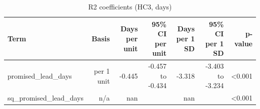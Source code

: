 \begin{table}[htbp]
\centering
\small
\caption{R2 coefficients (HC3, days)}
\begin{tabular}{lrrrrrr}
\toprule
Term & Basis & Days per unit & 95\% CI per unit & Days per 1 SD & 95\% CI per 1 SD & p-value \\
\midrule
promised\_lead\_days & per 1 unit & -0.445 & -0.457 to -0.434 & -3.318 & -3.403 to -3.234 & <0.001 \\
sq\_promised\_lead\_days & n/a & nan &  & nan &  & <0.001 \\
\bottomrule
\end{tabular}
\par\smallskip\begin{minipage}{\linewidth}\footnotesize \end{minipage}
\end{table}


